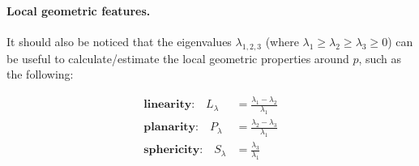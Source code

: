 %
\paragraph{Local geometric features.}

It should also be noticed that the eigenvalues $\lambda_{1,2,3}$ (where $\lambda_1 \geq \lambda_2 \geq \lambda_3 \geq 0$) can be useful to calculate/estimate the local geometric properties around $p$, such as the following:

\begin{equation}
\begin{aligned}
\textbf{linearity:} \quad L_\lambda &= \frac{\lambda_1 - \lambda_2}{\lambda_1} \\
\textbf{planarity:} \quad P_\lambda &= \frac{\lambda_2 - \lambda_3}{\lambda_1} \\
\textbf{sphericity:} \quad S_\lambda &= \frac{\lambda_3}{\lambda_1} \\
\end{aligned}
\end{equation}


